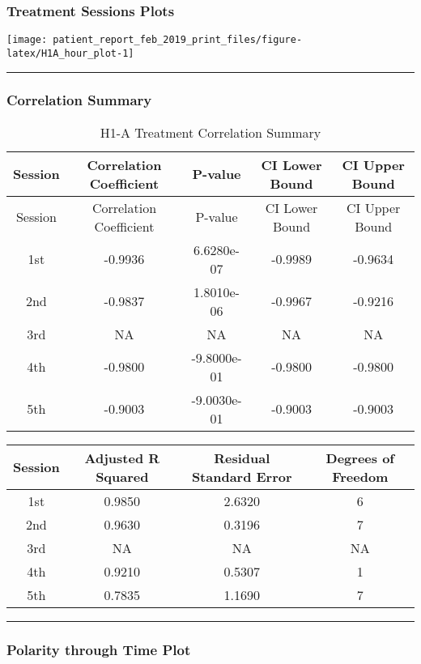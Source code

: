 \documentclass[]{article}
\begin{document}
\subsubsection{Treatment Sessions
Plots}\label{treatment-sessions-plots-3}

\texttt{[image: patient\_report\_feb\_2019\_print\_files/figure-latex/H1A\_hour\_plot-1]}

\begin{center}\rule{0.5\linewidth}{\linethickness}\end{center}

\subsubsection{Correlation Summary}\label{correlation-summary-3}

\begin{longtable}[]{@{}ccccc@{}}
\caption{H1-A Treatment Correlation Summary}\tabularnewline
\toprule
Session & Correlation Coefficient & P-value & CI Lower Bound & CI Upper
Bound\tabularnewline
\midrule
\endfirsthead
\toprule
Session & Correlation Coefficient & P-value & CI Lower Bound & CI Upper
Bound\tabularnewline
\midrule
\endhead
1st & -0.9936 & 6.6280e-07 & -0.9989 & -0.9634\tabularnewline
2nd & -0.9837 & 1.8010e-06 & -0.9967 & -0.9216\tabularnewline
3rd & NA & NA & NA & NA\tabularnewline
4th & -0.9800 & -9.8000e-01 & -0.9800 & -0.9800\tabularnewline
5th & -0.9003 & -9.0030e-01 & -0.9003 & -0.9003\tabularnewline
\bottomrule
\end{longtable}

\begin{longtable}[]{@{}cccc@{}}
\toprule
Session & Adjusted R Squared & Residual Standard Error & Degrees of
Freedom\tabularnewline
\midrule
\endhead
1st & 0.9850 & 2.6320 & 6\tabularnewline
2nd & 0.9630 & 0.3196 & 7\tabularnewline
3rd & NA & NA & NA\tabularnewline
4th & 0.9210 & 0.5307 & 1\tabularnewline
5th & 0.7835 & 1.1690 & 7\tabularnewline
\bottomrule
\end{longtable}

\begin{center}\rule{0.5\linewidth}{\linethickness}\end{center}

\subsubsection{Polarity through Time
Plot}\label{polarity-through-time-plot-3}
\end{document}
